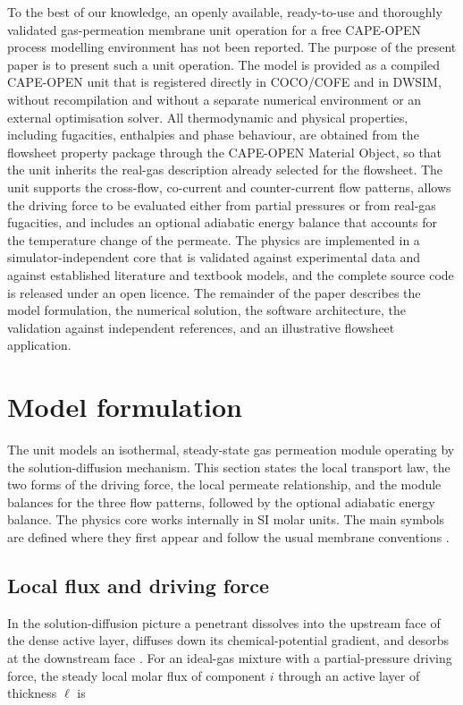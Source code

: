 \documentclass[a4paper,fleqn]{cas-dc}
\begin{document}
To the best of our knowledge, an openly available, ready-to-use and thoroughly
validated gas-permeation membrane unit operation for a free CAPE-OPEN process
modelling environment has not been reported. The purpose of the present paper is
to present such a unit operation. The model is provided as a compiled CAPE-OPEN
unit that is registered directly in COCO/COFE and in DWSIM, without recompilation
and without a separate numerical environment or an external optimisation solver. All thermodynamic and physical properties,
including fugacities, enthalpies and phase behaviour, are obtained from the
flowsheet property package through the CAPE-OPEN Material Object, so that the
unit inherits the real-gas description already selected for the flowsheet. The
unit supports the cross-flow, co-current and counter-current flow patterns,
allows the driving force to be evaluated either from partial pressures or from
real-gas fugacities, and includes an optional adiabatic energy balance that
accounts for the temperature change of the permeate. The physics are implemented
in a simulator-independent core that is validated against experimental data and
against established literature and textbook models, and the complete source code
is released under an open licence. The remainder of the paper describes the model
formulation, the numerical solution, the software architecture, the validation
against independent references, and an illustrative flowsheet application.

\section{Model formulation}\label{sec:model}
The unit models an isothermal, steady-state gas permeation module operating by
the solution-diffusion mechanism. This section states the local transport law,
the two forms of the driving force, the local permeate relationship, and the
module balances for the three flow patterns, followed by the optional adiabatic
energy balance. The physics core works internally in SI molar units. The main
symbols are defined where they first appear and follow the usual membrane
conventions \citep{baker2004}.

\subsection{Local flux and driving force}\label{sec:model-flux}
In the solution-diffusion picture a penetrant dissolves into the upstream face
of the dense active layer, diffuses down its chemical-potential gradient, and
desorbs at the downstream face \citep{wijmans1995}. For an ideal-gas mixture
with a partial-pressure driving force, the steady local molar flux of component
$i$ through an active layer of thickness $\ell$ is
\end{document}
